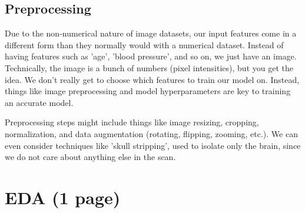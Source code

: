 \documentclass[conference]{IEEEtran}
\begin{document}
\subsection{\large Preprocessing}

Due to the non-numerical nature of image datasets, our input features come in a different form than they normally would with a numerical dataset. Instead of having features such as 'age', 'blood pressure', and so on, we just have an image. Technically, the image is a bunch of numbers (pixel intensities), but you get the idea. We don't really get to choose which features to train our model on. Instead, things like image preprocessing and model hyperparameters are key to training an accurate model.

Preprocessing steps might include things like image resizing, cropping, normalization, and data augmentation (rotating, flipping, zooming, etc.). We can even consider techniques like 'skull stripping', used to isolate only the brain, since we do not care about anything else in the scan.


\section{\large EDA (1 page)}




\end{document}
